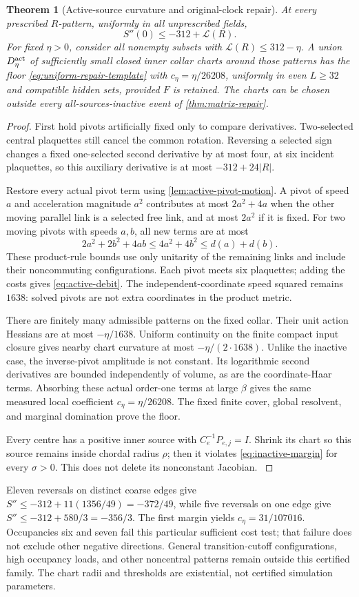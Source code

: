 \documentclass[11pt,oneside,openany]{book}
\newtheorem{theorem}{Theorem}[chapter]
\theoremstyle{definition}
\theoremstyle{remark}
\newcommand{\src}[2]{\cite[#2]{#1}}
\begin{document}
\begin{theorem}[Active-source curvature and original-clock repair]
\label{thm:active-repair}
At every prescribed $R$-pattern, uniformly in all unprescribed fields,
\[
 S''(0)\le-312+\mathcal L(R).
\]
For fixed $\eta>0$, consider all nonempty subsets with
$\mathcal L(R)\le312-\eta$. A union $D_\eta^{\rm act}$ of sufficiently
small closed inner collar charts around those patterns has the floor
\cref{eq:uniform-repair-template} with $c_\eta=\eta/26208$, uniformly
in even $L\ge32$ and compatible hidden sets, provided $F$ is retained.
The charts can be chosen outside every all-sources-inactive event of
\cref{thm:matrix-repair}.
\end{theorem}
\begin{proof}
First hold pivots artificially fixed only to compare derivatives.
Two-selected central plaquettes still cancel the common rotation.
Reversing a selected sign changes a fixed one-selected second
derivative by at most four, at six incident plaquettes, so this
auxiliary derivative is at most $-312+24|R|$.

Restore every actual pivot term using \cref{lem:active-pivot-motion}.
A pivot of speed $a$ and acceleration magnitude $a^2$ contributes at
most $2a^2+4a$ when the other moving parallel link is a selected free
link, and at most $2a^2$ if it is fixed. For two moving pivots with
speeds $a,b$, all new terms are at most
\[
 2a^2+2b^2+4ab\le4a^2+4b^2\le d(a)+d(b).
\]
These product-rule bounds use only unitarity of the remaining links
and include their noncommuting configurations. Each pivot meets six
plaquettes; adding the costs gives \cref{eq:active-debit}. The
independent-coordinate speed squared remains $1638$: solved pivots
are not extra coordinates in the product metric.

There are finitely many admissible patterns on the fixed collar.
Their unit action Hessians are at most $-\eta/1638$. Uniform continuity
on the finite compact input closure gives nearby chart curvature at
most $-\eta/(2\cdot1638)$. Unlike the inactive case, the inverse-pivot
amplitude is not constant. Its logarithmic second derivatives are
bounded independently of volume, as are the coordinate-Haar terms.
Absorbing these actual order-one terms at large $\beta$ gives the same
measured local coefficient $c_\eta=\eta/26208$. The fixed finite
cover, global resolvent, and marginal domination prove the floor.

Every centre has a positive inner source with $C_e^{-1}P_{e,j}=I$.
Shrink its chart so this source remains inside chordal radius $\rho$;
then it violates \cref{eq:inactive-margin} for every $\sigma>0$.
This does not delete its nonconstant Jacobian. \src{F13}{V17}
\end{proof}
Eleven reversals on distinct coarse edges give
$S''\le-312+11(1356/49)=-372/49$, while five reversals on one edge
give $S''\le-312+580/3=-356/3$. The first margin yields
$c_\eta=31/107016$. Occupancies six and seven fail this particular
sufficient cost test; that failure does not exclude other negative
directions. General transition-cutoff configurations, high occupancy
loads, and other noncentral patterns remain outside this certified
family. The chart radii and thresholds are existential, not certified
simulation parameters.
\end{document}

